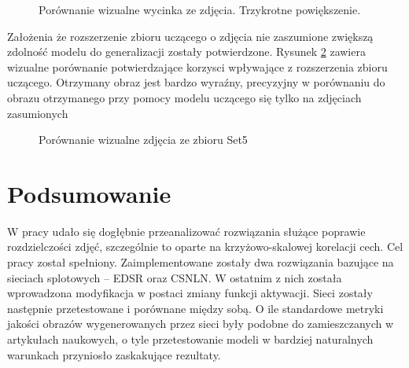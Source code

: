 \documentclass[a4paper,12pt,twoside,openany]{report}
\newcommand{\ImgPath}{.}
\begin{document}
	\begin{figure}[!htbp]
		\centering
		\caption{Porównanie wizualne wycinka ze zdjęcia. Trzykrotne powiększenie.}
		\label{fig:cropShumandNormalx3}
	\end{figure}	
	\newpage
	Założenia że rozszerzenie zbioru uczącego o zdjęcia nie zaszumione zwiększą zdolność modelu do generalizacji zostały potwierdzone. Rysunek \ref{fig:cropShumandNormal} zawiera wizualne porównanie potwierdzające korzysci wpływające z rozszerzenia zbioru uczącego. Otrzymany obraz jest bardzo wyraźny, precyzyjny  w porównaniu do obrazu otrzymanego przy pomocy modelu uczącego się tylko na zdjęciach zasumionych 
	\begin{figure}[!htbp]
		\centering
		\caption{Porównanie wizualne zdjęcia ze zbioru Set5}
		\label{fig:cropShumandNormal}
	\end{figure}
\chapter{Podsumowanie}
W pracy udało się dogłębnie przeanalizować rozwiązania służące poprawie rozdzielczości zdjęć, szczególnie to oparte na krzyżowo-skalowej korelacji cech. Cel pracy został spełniony. Zaimplementowane zostały dwa rozwiązania bazujące na sieciach splotowych – EDSR oraz CSNLN. W ostatnim z nich została wprowadzona modyfikacja w postaci zmiany funkcji aktywacji. Sieci zostały następnie przetestowane i porównane między sobą. O ile standardowe metryki jakości obrazów wygenerowanych przez sieci były podobne do zamieszczanych w artykułach naukowych, o tyle przetestowanie modeli w bardziej naturalnych warunkach przyniosło zaskakujące rezultaty.
\end{document}
